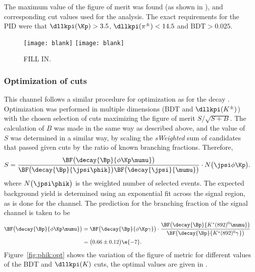 The maximum value of the figure of merit
was found (as shown in ), and corresponding cut values used for the analysis.
The exact requirements for the PID were that $\dllkpi(\Kp)>3.5$, $\dllkpi(\pi^\pm)<14.5$ and
$\mathrm{BDT}>0.025$.

\begin{figure}
  \begin{center}
    \texttt{[image: blank]}
    \texttt{[image: blank]}
    \caption{\small
      FILL IN.
    }
    \label{fig:kpipi:opt}
  \end{center}
\end{figure}


\subsubsection[Optimization of \btophikmumu cuts]
{Optimization of \tmath{\btophikmumu} cuts}
This channel follows a similar procedure for optimization as for the decay \btokpipimumu.
Optimization was performed in multiple dimensions (BDT and $\dllkpi(K^\pm)$) with the chosen
selection of cuts maximizing the figure of merit $S/\sqrt{S+B}$.
The calculation of $B$ was made in the same way as described above, and the
value of $S$ was determined in a similar way, by scaling the \emph{sWeighted} sum of candidates
that passed given cuts by the ratio of known branching fractions.
Therefore,
\begin{equation}
  S =
  \frac{
    \BF\big(\decay{\Bp}{\phi\Kp\mumu}\big)
  }{
    \BF\big(\decay{\Bp}{\jpsi\phik}\big)
    \BF\big(\decay{\jpsi}{\mumu}\big)
  }
  \cdot
  N\big(\jpsi\phi\Kp\big).
\end{equation}
where $N\big(\jpsi\phik\big)$ is the weighted number of selected \btojpsiphik events.
The expected background yield is determined using an exponential fit across the signal region, as
is done for the \btokpipimumu channel.
The prediction for the branching fraction of the signal channel is taken to be
\begin{align}
  \BF\big(\decay{\Bp}{\phi\Kp\mumu}\big)
  &=
  \BF\big(\decay{\Bp}{\phi\Kp\gamma}\big)
  \cdot\frac{
    \BF\big(\decay{\Bp}{K^*(892)^0\mumu}\big)
  }{
    \BF\big(\decay{\Bp}{K^*(892)^0\gamma^{}}\big)
  }\nonumber\\
  &=\big(0.66\pm0.12\big)\e{-7}.
\end{align}
Figure~\ref{fig:phik:opt} shows the variation of the figure of metric for different values of the
BDT and $\dllkpi(K)$ cuts, the optimal values are given in .

